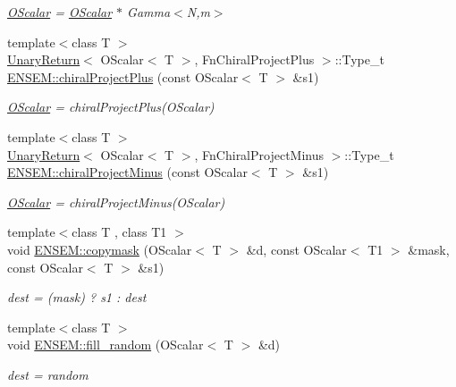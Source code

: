 \begin{DoxyCompactItemize}
\begin{DoxyCompactList}\small\item\em \mbox{\hyperlink{classENSEM_1_1OScalar}{O\+Scalar}} = \mbox{\hyperlink{classENSEM_1_1OScalar}{O\+Scalar}} $\ast$ Gamma$<$\+N,m$>$ \end{DoxyCompactList}\item 
{\footnotesize template$<$class T $>$ }\\\mbox{\hyperlink{structUnaryReturn}{Unary\+Return}}$<$ O\+Scalar$<$ T $>$, Fn\+Chiral\+Project\+Plus $>$\+::Type\+\_\+t \mbox{\hyperlink{group__obsscalar_gad83dc4f2cde27e1d12f3eb6eb672bf87}{E\+N\+S\+E\+M\+::chiral\+Project\+Plus}} (const O\+Scalar$<$ T $>$ \&s1)
\begin{DoxyCompactList}\small\item\em \mbox{\hyperlink{classENSEM_1_1OScalar}{O\+Scalar}} = chiral\+Project\+Plus(\+O\+Scalar) \end{DoxyCompactList}\item 
{\footnotesize template$<$class T $>$ }\\\mbox{\hyperlink{structUnaryReturn}{Unary\+Return}}$<$ O\+Scalar$<$ T $>$, Fn\+Chiral\+Project\+Minus $>$\+::Type\+\_\+t \mbox{\hyperlink{group__obsscalar_ga53162d32552af7a67c288bfa204dce7c}{E\+N\+S\+E\+M\+::chiral\+Project\+Minus}} (const O\+Scalar$<$ T $>$ \&s1)
\begin{DoxyCompactList}\small\item\em \mbox{\hyperlink{classENSEM_1_1OScalar}{O\+Scalar}} = chiral\+Project\+Minus(\+O\+Scalar) \end{DoxyCompactList}\item 
{\footnotesize template$<$class T , class T1 $>$ }\\void \mbox{\hyperlink{group__obsscalar_gada3c474cf374d31a9df7c6cba2d608eb}{E\+N\+S\+E\+M\+::copymask}} (O\+Scalar$<$ T $>$ \&d, const O\+Scalar$<$ T1 $>$ \&mask, const O\+Scalar$<$ T $>$ \&s1)
\begin{DoxyCompactList}\small\item\em dest = (mask) ? s1 \+: dest \end{DoxyCompactList}\item 
{\footnotesize template$<$class T $>$ }\\void \mbox{\hyperlink{group__obsscalar_ga8550bbdcfe7af4b27a905b3f89cca5b3}{E\+N\+S\+E\+M\+::fill\+\_\+random}} (O\+Scalar$<$ T $>$ \&d)
\begin{DoxyCompactList}\small\item\em dest = random \end{DoxyCompactList}\item 

\end{DoxyCompactItemize}
